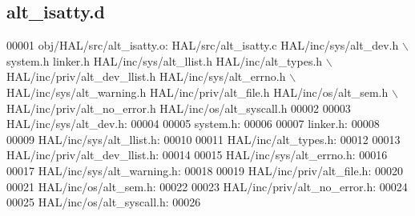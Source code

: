 \subsection{alt\+\_\+isatty.\+d}
\label{alt__isatty_8d_source}

\begin{DoxyCode}
00001 obj/HAL/src/alt\_isatty.o: HAL/src/alt\_isatty.c HAL/inc/sys/alt_dev.h \(\backslash\)
 system.h linker.h HAL/inc/sys/alt_llist.h HAL/inc/alt\_types.h \(\backslash\)
 HAL/inc/priv/alt_dev_llist.h HAL/inc/sys/alt_errno.h \(\backslash\)
 HAL/inc/sys/alt\_warning.h HAL/inc/priv/alt\_file.h HAL/inc/os/alt\_sem.h \(\backslash\)
 HAL/inc/priv/alt_no_error.h HAL/inc/os/alt\_syscall.h
00002 
00003 HAL/inc/sys/alt_dev.h:
00004 
00005 system.h:
00006 
00007 linker.h:
00008 
00009 HAL/inc/sys/alt_llist.h:
00010 
00011 HAL/inc/alt\_types.h:
00012 
00013 HAL/inc/priv/alt_dev_llist.h:
00014 
00015 HAL/inc/sys/alt_errno.h:
00016 
00017 HAL/inc/sys/alt\_warning.h:
00018 
00019 HAL/inc/priv/alt\_file.h:
00020 
00021 HAL/inc/os/alt\_sem.h:
00022 
00023 HAL/inc/priv/alt_no_error.h:
00024 
00025 HAL/inc/os/alt\_syscall.h:
00026 \end{DoxyCode}
